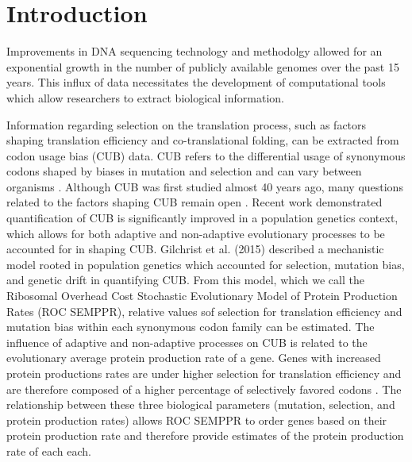 \documentclass{bioinfo}
\begin{document}
\section*{Introduction}
Improvements in DNA sequencing technology and methodolgy allowed for an exponential growth in the number of publicly available genomes over the past 15 years.
This influx of data necessitates the development of computational tools which allow researchers to extract biological information.

Information regarding selection on the translation process, such as factors shaping translation efficiency and co-translational folding, can be extracted from codon usage bias (CUB) data.
CUB refers to the differential usage of synonymous codons shaped by biases in mutation and selection and can vary between organisms \citep{bulmer1991, sharp1993}.
Although CUB was first studied almost 40 years ago, many questions related to the factors shaping CUB remain open \citep{shah2011, wallace2013, gilchrist2015}.
Recent work demonstrated quantification of CUB is significantly improved in a population genetics context, which allows for both adaptive and non-adaptive evolutionary processes to be accounted for in shaping CUB.
Gilchrist et al. (2015) described a mechanistic model rooted in population genetics which accounted for selection, mutation bias, and genetic drift in quantifying CUB. 
From this model, which we call the Ribosomal Overhead Cost Stochastic Evolutionary Model of Protein Production Rates (ROC SEMPPR), relative values sof selection for translation efficiency and mutation bias within each synonymous codon family can be estimated. 
The influence of adaptive and non-adaptive processes on CUB is related to the evolutionary average protein production rate of a gene. Genes with increased protein productions rates are under higher selection for translation efficiency and are therefore composed of a higher percentage of selectively favored codons \citep{shah2011, wallace2013, gilchrist2015}. The relationship between these three biological parameters (mutation, selection, and protein production rates) allows ROC SEMPPR to order genes based on their protein production rate and therefore provide estimates of the protein production rate of each each. 
\end{document}

